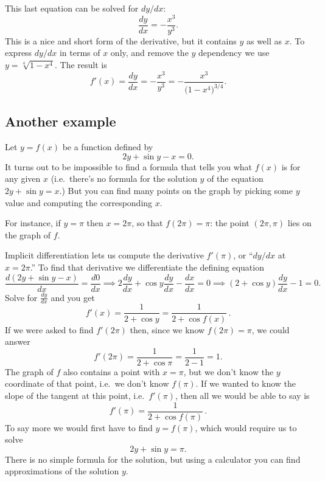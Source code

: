 This last equation can be solved for $dy/dx$:
\[
\frac{dy}{dx} = -\frac{x^3}{y^3}.
\]
This is a nice and short form of the derivative, but it contains $y$ as well as
$x$.  To express $dy/dx$ in terms of $x$ only, and remove the $y$
dependency we use $y=\sqrt[4]{1-x^4}$.  The result is
\[
f'(x) = \frac{dy}{dx} =
-\frac{x^3}{y^3}=-\frac{x^3}{\bigl(1-x^4\bigr)^{3/4}}.
\]

\subsection{Another example}
Let $y=f(x)$ be a function defined by
\[
2y+\sin y - x=0.
\]
It turns out to be impossible to find a formula that tells you what
$f(x)$ is for any given $x$ (i.e.~there's no formula for the solution
$y$ of the equation $2y+\sin y =x$.)  But you can find many points on
the graph by picking some $y$ value and computing the corresponding
$x$.

For instance, if $y=\pi$ then $x=2\pi$, so that $f(2\pi) = \pi$:  the
point $(2\pi, \pi)$ lies on the graph of $f$.

Implicit differentiation lets us compute the derivative $f'(\pi)$, or
``$dy/dx$ at $x=2\pi$.''  To find that derivative we differentiate the
defining equation
\[
\frac{d(2y+\sin y - x)}{dx} = \frac{d0}{dx}
\implies
2\frac{dy}{dx}+\cos y \frac{dy}{dx} - \frac{dx}{dx} = 0
\implies
(2+\cos y) \frac{dy}{dx} -1 =0.
\]%
%
Solve for $\frac{dy}{dx}$ and you get
\[
f'(x) = \frac{1}{2+\cos y} = \frac1{2+\cos f(x)}\,.
\]
If we were asked to find $f'(2\pi)$ then, since we know $f(2\pi) = \pi$, we
could answer
\[
f'(2\pi) = \frac1{2+\cos \pi} = \frac1{2-1} = 1.
\]
The graph of $f$ also contains a point with $x=\pi$, but we don't know
the $y$ coordinate of that point, i.e.~we don't know $f(\pi)$.  If we
wanted to know the slope of the tangent at this point, i.e.~$f'(\pi)$,
then all we would be able to say is
\[
f'(\pi) = \frac1{2+\cos f(\pi)}\,.
\]
To say more we would first have to find $y=f(\pi)$, which would
require us to solve
\[
2y+\sin y = \pi.
\]
There is no simple formula for the solution, but using a calculator
you can find approximations of the solution $y$.

